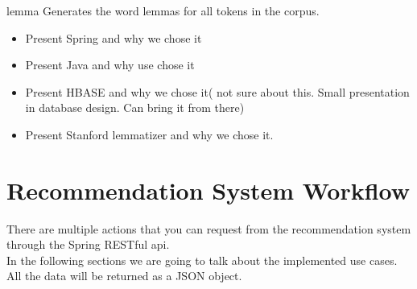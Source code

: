 lemma
Generates the word lemmas for all tokens in the corpus.

\begin{itemize}
	\item Present Spring and why we chose it	
	\item Present Java and why use chose it
	\item Present HBASE and why we chose it( not sure about this. Small presentation in database design. Can bring it from there)
	\item Present Stanford lemmatizer and why we chose it.	
\end{itemize}


\section{Recommendation System Workflow} 
\label{sec:workflow}
There are multiple actions that you can request from the recommendation system through the Spring RESTful api.
\\ In the following sections we are going to talk about the implemented use cases.
\\ All the data will be returned as a JSON object.

\hfill \break
\hfill \break
\hfill \break
\hfill \break

